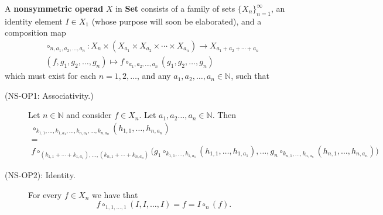 \begin{definition}
    A \textbf{nonsymmetric operad} $X$ in \textbf{Set} consists of 
    a family of sets $\{X_n\}_{n=1}^{\infty}$, an identity element $I \in X_1$ (whose purpose will soon be elaborated),
    and a composition map 
    \begin{align*}
        \circ_{n, a_1, a_2, \dots, a_n}: X_n \times (X_{a_1} \times X_{a_2}\times \cdots \times X_{a_n}) \to X_{a_1 + a_2 + \cdots + a_n}\\
        (f, g_1, g_2, \dots, g_n) \mapsto f\circ_{a_1, a_2, \dots, a_n} (g_1, g_2, \dots, g_n)
    \end{align*}
    which must exist for each $n = 1, 2, \dots$, and any $a_1, a_2, \dots, a_n \in \mathbb{N}$, 
    such that
    \begin{description}
        \item[(NS-OP1: Associativity.) ] Let $n \in \mathbb{N}$ and consider $f \in X_n$. 
        Let $a_1, a_2 \dots, a_n \in \mathbb{N}$. Then  
        \begin{gather*}
            [f \circ_{a_1, a_2, \dots, a_n} (g_1, g_2, \dots, g_n)]\circ_{k_{1,1}, \dots, k_{1, a_1}, \dots, k_{n, a_1}, \dots, k_{n, a_n}}(h_{1,1}, \dots, h_{n, a_n})\\
            =\\
            f \circ_{(k_{1,1}+ \cdots + k_{1, a_1}), \dots, (k_{n, 1}+ \cdots + k_{n, a_n})}
    \big(g_1 \circ_{k_{1,1}, \dots, k_{1, a_1}}(h_{1,1}, \dots, h_{1, a_1}), \dots, g_n \circ_{k_{n, 1}, \dots, k_{n, a_n}}(h_{n,1}, \dots, h_{n, a_n})\big)
        \end{gather*}
        \item[(NS-OP2): Identity.] For every $f \in X_n$ we have that 
        \[
            f \circ_{1, 1, \dots, 1} (I, I, \dots, I) = f = I \circ_n (f).
        \]   
    \end{description}
\end{definition}

